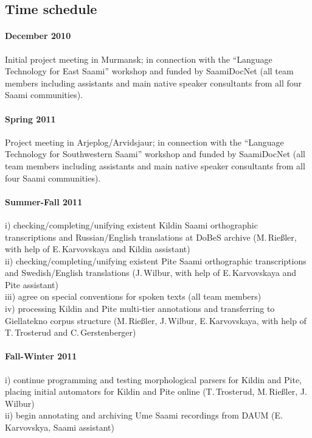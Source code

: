 \documentclass[a4paper,12pt]{article}
\begin{document}
{{{{\subsection{Time schedule}

\paragraph{December 2010}Initial project meeting in Murmansk; in connection with the “Language Technology for East Saami” workshop and funded by SaamiDocNet (all team members including assistants and main native speaker consultants from all four Saami communities).

\paragraph{Spring 2011}Project meeting in Arjeplog/Arvidsjaur; in connection with the “Language Technology for Southwestern Saami” workshop and funded by SaamiDocNet (all team members including assistants and main native speaker consultants from all four Saami communities).

\paragraph{Summer-Fall 2011}
i) checking/completing/unifying existent Kildin Saami orthographic transcriptions and Russian/English translations at DoBeS archive (M.\,Rießler, with help of E.\,Karvovskaya and Kildin assistant)\\
ii) checking/completing/unifying existent Pite Saami orthographic transcriptions and Swedish/English translations (J.\,Wilbur, with help of E.\,Karvovskaya and Pite assistant)\\%
iii) agree on special conventions for spoken texts (all team members)\\
iv) processing Kildin and Pite multi-tier annotations %
and transferring to Giellatekno corpus structure (M.\,Rießler, J.\,Wilbur, E.\,Karvovskaya, with help of T.\,Trosterud and C.\,Gerstenberger)

\paragraph{Fall-Winter 2011}
i) continue programming and testing morphological parsers for Kildin and Pite, %
placing initial automators for Kildin and Pite online %
(T.\,Trosterud, M.\,Rießler, J.\,Wilbur)\\
ii) begin annotating and archiving Ume Saami recordings from DAUM (E.\,Karvovskya, Saami assistant)

}}}}
\end{document}
